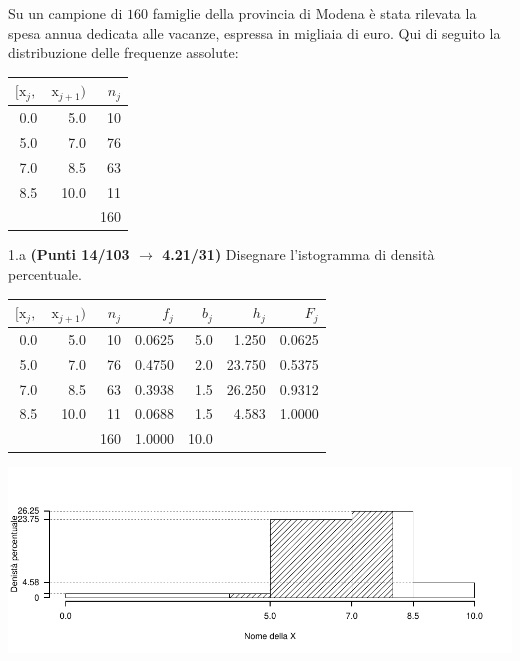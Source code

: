 \documentclass[
  11pt,
]{book}
\theoremstyle{mytheoremstyle}
\theoremstyle{mydefstyle}
\newenvironment{sol}
  {
  \begin{tcolorbox}[enhanced,breakable,arc=0.1mm,boxrule=1pt,colback=white,colframe=iblue,
  title=\bf \fontfamily{lmss}\selectfont \hspace{.5 cm} Soluzione,drop fuzzy shadow]

}{
\end{tcolorbox}
  }
\begin{document}
Su un campione di \(160\) famiglie della provincia di Modena è stata rilevata la spesa annua dedicata alle vacanze, espressa in migliaia di euro. Qui di seguito la distribuzione delle frequenze assolute:

\begin{table}[H]
\centering
\begin{tabular}{rrr}
\toprule
$[\text{x}_j,$ & $\text{x}_{j+1})$ & $n_j$\\
\midrule
0.0 & 5.0 & 10\\
5.0 & 7.0 & 76\\
7.0 & 8.5 & 63\\
8.5 & 10.0 & 11\\
 &  & 160\\
\bottomrule
\end{tabular}
\end{table}

1.a \textbf{(Punti 14/103 \(\rightarrow\) 4.21/31)} Disegnare l'istogramma di densità percentuale.

\begin{sol}

\begin{table}[H]
\centering
\begin{tabular}{rrrrrrr}
\toprule
$[\text{x}_j,$ & $\text{x}_{j+1})$ & $n_j$ & $f_j$ & $b_j$ & $h_j$ & $F_j$\\
\midrule
0.0 & 5.0 & 10 & 0.0625 & 5.0 & 1.250 & 0.0625\\
5.0 & 7.0 & 76 & 0.4750 & 2.0 & 23.750 & 0.5375\\
7.0 & 8.5 & 63 & 0.3938 & 1.5 & 26.250 & 0.9312\\
8.5 & 10.0 & 11 & 0.0688 & 1.5 & 4.583 & 1.0000\\
 &  & 160 & 1.0000 & 10.0 &  & \\
\bottomrule
\end{tabular}
\end{table}

\begin{center}\includegraphics{Esami_passati_con_soluzioni_files/figure-latex/2023-171-1} \end{center}

\end{sol}
\end{document}
